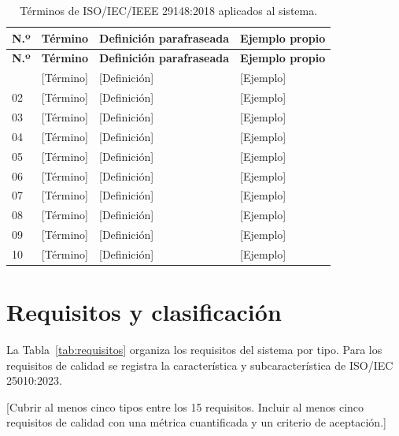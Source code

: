 \documentclass[11pt,a4paper]{article}
\newcommand{\campo}[1]{\textcolor{placeholder}{[#1]}}
\renewcommand{\arraystretch}{1.35}
\begin{document}
{\small
\renewcommand{\arraystretch}{1.2}
\begin{longtable}{@{}L{0.65cm}L{3.4cm}L{5.8cm}L{5.55cm}@{}}
\caption{Términos de ISO/IEC/IEEE 29148:2018 aplicados al sistema.}\label{tab:glosario}\\
\toprule
\textbf{N.º} & \textbf{Término} & \textbf{Definición parafraseada} & \textbf{Ejemplo propio} \\
\midrule
\endfirsthead
\toprule
\textbf{N.º} & \textbf{Término} & \textbf{Definición parafraseada} & \textbf{Ejemplo propio} \\
\midrule
\endhead
\bottomrule
{} & \campo{Término} & \campo{Definición} & \campo{Ejemplo} \\
02 & \campo{Término} & \campo{Definición} & \campo{Ejemplo} \\
03 & \campo{Término} & \campo{Definición} & \campo{Ejemplo} \\
04 & \campo{Término} & \campo{Definición} & \campo{Ejemplo} \\
05 & \campo{Término} & \campo{Definición} & \campo{Ejemplo} \\
06 & \campo{Término} & \campo{Definición} & \campo{Ejemplo} \\
07 & \campo{Término} & \campo{Definición} & \campo{Ejemplo} \\
08 & \campo{Término} & \campo{Definición} & \campo{Ejemplo} \\
09 & \campo{Término} & \campo{Definición} & \campo{Ejemplo} \\
10 & \campo{Término} & \campo{Definición} & \campo{Ejemplo} \\
\end{longtable}
}

\section{Requisitos y clasificación}

La Tabla~\ref{tab:requisitos} organiza los requisitos del sistema por tipo. Para los requisitos de calidad se registra la característica y subcaracterística de ISO/IEC 25010:2023.

\campo{Cubrir al menos cinco tipos entre los 15 requisitos. Incluir al menos cinco requisitos de calidad con una métrica cuantificada y un criterio de aceptación.}
\end{document}
